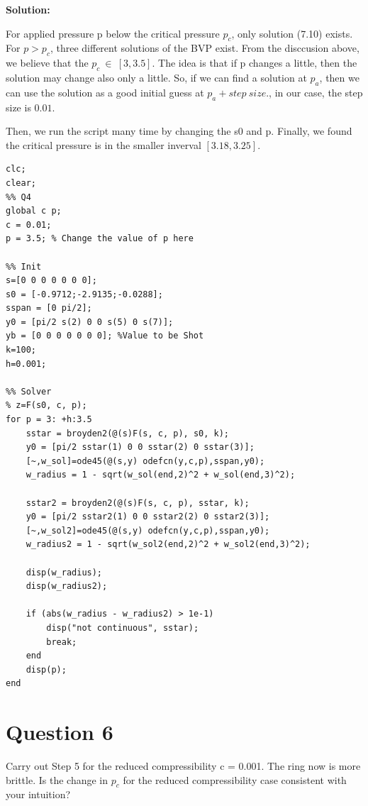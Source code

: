 \documentclass{article}
\begin{document}
\textbf{Solution:} 

For applied pressure p below the critical pressure $p_c$, only
solution (7.10) exists. For $p > p_c$, three different solutions of the BVP exist. From the disccusion above, we believe that the $p_c \ \in \ [3,3.5]$. The idea is that if p changes a little, then the solution may change also only a little. So, if we can find a solution at $p_a$, then we can use the solution as a good initial guess at $p_a+ step \ size$., in our case, the step size is $0.01$. 


Then, we run the script many time by changing the s0 and p. Finally, we found the critical pressure is in the smaller inverval $[3.18,3.25]$. 
 


\begin{lstlisting}
clc;
clear;
%% Q4
global c p;
c = 0.01;
p = 3.5; % Change the value of p here

%% Init
s=[0 0 0 0 0 0 0]; 
s0 = [-0.9712;-2.9135;-0.0288];
sspan = [0 pi/2];
y0 = [pi/2 s(2) 0 0 s(5) 0 s(7)];
yb = [0 0 0 0 0 0 0]; %Value to be Shot
k=100;
h=0.001;

%% Solver
% z=F(s0, c, p);
for p = 3: +h:3.5
	sstar = broyden2(@(s)F(s, c, p), s0, k); 
	y0 = [pi/2 sstar(1) 0 0 sstar(2) 0 sstar(3)];
	[~,w_sol]=ode45(@(s,y) odefcn(y,c,p),sspan,y0);
	w_radius = 1 - sqrt(w_sol(end,2)^2 + w_sol(end,3)^2);
	
	sstar2 = broyden2(@(s)F(s, c, p), sstar, k); 
	y0 = [pi/2 sstar2(1) 0 0 sstar2(2) 0 sstar2(3)];
	[~,w_sol2]=ode45(@(s,y) odefcn(y,c,p),sspan,y0);
	w_radius2 = 1 - sqrt(w_sol2(end,2)^2 + w_sol2(end,3)^2);
	
	disp(w_radius);
	disp(w_radius2);
	
	if (abs(w_radius - w_radius2) > 1e-1)
		disp("not continuous", sstar);
		break;
	end
	disp(p); 
end
\end{lstlisting}


\section*{Question 6} 
Carry out Step 5 for the reduced compressibility c = 0.001. The ring now is more brittle.
Is the change in $p_c$ for the reduced compressibility case consistent with your intuition?
\end{document}
